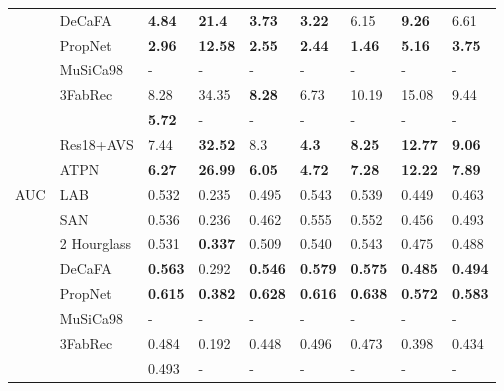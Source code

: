 \documentclass[3p,twocolumn, round, sort & compress]{elsarticle}
\begin{document}
\begin{table*}[t!]
\begin{tabular}{m{1.4cm}<{\centering}|m{3.8cm}<{\centering}|m{0.8cm}<{\centering}|m{0.7cm}<{\centering}|m{1.4cm}<{\centering}|m{1.5cm}<{\centering}|m{1.3cm}<{\centering}|m{1.2cm}<{\centering}|m{0.7cm}<{\centering}}
		& DeCaFA & {\color{blue} \textbf{4.84}} & {\color{blue} \textbf{21.4}} & {\color{blue} \textbf{3.73}} & {\color{blue} \textbf{3.22}} & 6.15 & {\color{blue} \textbf{9.26}} & 6.61  \\
		& PropNet & {\color{red} \textbf{2.96}} & {\color{red} \textbf{12.58}} & {\color{red} \textbf{2.55}} & {\color{red} \textbf{2.44}} & {\color{red} \textbf{1.46}} & {\color{red} \textbf{5.16}} & {\color{red} \textbf{3.75}}  \\ 
		\cline{2-9}
		& MuSiCa98 & - & - & - & - & - & - & - \\
		& 3FabRec   & 8.28    & 34.35 & {\color{blue} \textbf{8.28}}       & 6.73         & 10.19   & 15.08     & 9.44  \\
		&  & {\color{red} \textbf{5.72}} & - & - & - & - & - & -\\
		& Res18+AVS & 7.44    & {\color{blue} \textbf{32.52}} & 8.3 & {\color{red} \textbf{4.3}} & {\color{blue} \textbf{8.25}} & {\color{blue} \textbf{12.77}} & {\color{blue} \textbf{9.06}}  \\
		& ATPN & {\color{blue} \textbf{6.27}} & {\color{red} \textbf{26.99}} & {\color{red} \textbf{6.05}} & {\color{blue} \textbf{4.72}} & {\color{red} \textbf{7.28}} & {\color{red} \textbf{12.22}} & {\color{red} \textbf{7.89}} \\ \hline
		\multirow{10}{*}{AUC}
		& LAB & 0.532 & 0.235 & 0.495 & 0.543 & 0.539 & 0.449 & 0.463 \\
		& SAN & 0.536   & 0.236 & 0.462      & 0.555        & 0.552   & 0.456     & 0.493 \\
		& 2 Hourglass & 0.531   & {\color{blue} \textbf{0.337}} & 0.509      & 0.540        & 0.543   & 0.475     & 0.488 \\
		& DeCaFA & {\color{blue} \textbf{0.563}} & 0.292 & {\color{blue} \textbf{0.546}}      & {\color{blue} \textbf{0.579}}        & {\color{blue} \textbf{0.575}}   & {\color{blue} \textbf{0.485}}     & {\color{blue} \textbf{0.494}} \\
		& PropNet & {\color{red} \textbf{0.615}} & {\color{red} \textbf{0.382}} & {\color{red} \textbf{0.628}} & {\color{red} \textbf{0.616}}  & {\color{red} \textbf{0.638}} & {\color{red} \textbf{0.572}}  & {\color{red} \textbf{0.583}} \\ \cline{2-9} 
		& MuSiCa98 & - & - & - & - & - & - & - \\
		& 3FabRec & 0.484   & 0.192 & 0.448      & 0.496        & 0.473   & 0.398     & 0.434 \\
		&  & 0.493 & - & - & - & - & - & -\\

\end{tabular}
\end{table*}
\end{document}
